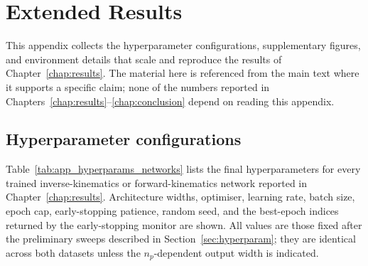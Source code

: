 \chapter{Extended Results}
\label{app:extended}

This appendix collects the hyperparameter configurations, supplementary figures, and environment details that scale and reproduce the results of Chapter~\ref{chap:results}. The material here is referenced from the main text where it supports a specific claim; none of the numbers reported in Chapters~\ref{chap:results}--\ref{chap:conclusion} depend on reading this appendix.

\section{Hyperparameter configurations}
\label{app:hyperparameters}

Table~\ref{tab:app_hyperparams_networks} lists the final hyperparameters for every trained inverse-kinematics or forward-kinematics network reported in Chapter~\ref{chap:results}. Architecture widths, optimiser, learning rate, batch size, epoch cap, early-stopping patience, random seed, and the best-epoch indices returned by the early-stopping monitor are shown. All values are those fixed after the preliminary sweeps described in Section~\ref{sec:hyperparam}; they are identical across both datasets unless the $n_{p}$-dependent output width is indicated.

